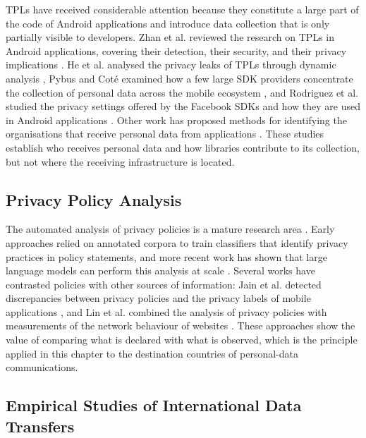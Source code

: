 TPLs have received considerable attention because they constitute a large part of the code of Android applications \cite{Wang2017UnderstandingAnalysis} and introduce data collection that is only partially visible to developers. Zhan et al. reviewed the research on TPLs in Android applications, covering their detection, their security, and their privacy implications \cite{Zhan2022ResearchReview}. He et al. analysed the privacy leaks of TPLs through dynamic analysis \cite{He2019DynamicLibraries}, Pybus and Cot\'{e} examined how a few large SDK providers concentrate the collection of personal data across the mobile ecosystem \cite{Pybus2024SuperMobile}, and Rodriguez et al. studied the privacy settings offered by the Facebook SDKs and how they are used in Android applications \cite{Rodriguez2025PrivacySDKs}. Other work has proposed methods for identifying the organisations that receive personal data from applications \cite{Rodriguez2024ROI:Data}. These studies establish who receives personal data and how libraries contribute to its collection, but not where the receiving infrastructure is located.

\subsection{Privacy Policy Analysis}
\label{sc:anycast_experiments_sota_policies}

The automated analysis of privacy policies is a mature research area \cite{DelAlamo2022APolicies}. Early approaches relied on annotated corpora to train classifiers that identify privacy practices in policy statements, and more recent work has shown that large language models can perform this analysis at scale \cite{Rodriguez2024LargeScale}. Several works have contrasted policies with other sources of information: Jain et al. detected discrepancies between privacy policies and the privacy labels of mobile applications \cite{Jain2023ATLAS:Labels}, and Lin et al. combined the analysis of privacy policies with measurements of the network behaviour of websites \cite{Lin2022PrivacyPolicies}. These approaches show the value of comparing what is declared with what is observed, which is the principle applied in this chapter to the destination countries of personal-data communications.

\subsection{Empirical Studies of International Data Transfers}
\label{sc:anycast_experiments_sota_transfers}

